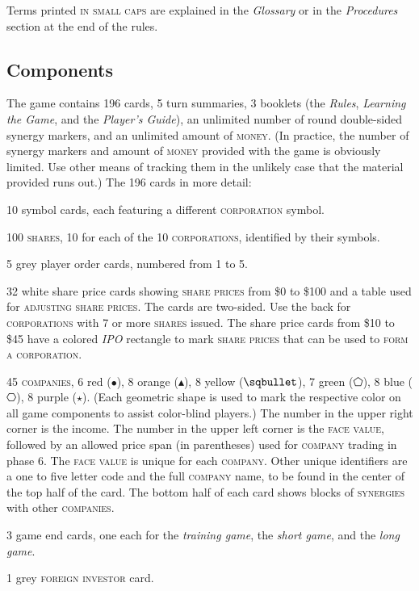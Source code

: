\documentclass[8pt]{extarticle}
\newenvironment{my_itemize}
{\begin{list}{\labelitemi}{\leftmargin=1.2em}
  \setlength{\itemsep}{1pt}
  \setlength{\parskip}{0pt}
  \setlength{\parsep}{0pt}}
{\end{list}}
\begin{document}
\begin{small}
\begin{multicols}{2}

{

  Terms printed \textsc{in small caps} are explained in the
  \emph{Glossary} or in the \emph{Procedures} section at the end of
  the rules.

\subsection*{Components}

The game contains 196 cards, 5 turn summaries, 3 booklets (the
\emph{Rules}, \emph{Learning the Game}, and the \emph{Player's
  Guide}), an unlimited number of round double-sided synergy markers,
and an unlimited amount of \textsc{money}. (In practice, the number of
synergy markers and amount of \textsc{money} provided with the game is
obviously limited. Use other means of tracking them in the unlikely
case that the material provided runs out.) The 196 cards in more
detail:
\begin{my_itemize}
\item 10 symbol cards, each featuring a different
  \textsc{corporation} symbol.
\item 100 \textsc{shares}, 10 for each of the 10
  \textsc{corporations}, identified by their symbols.
\item 5 grey player order cards, numbered from 1 to 5.
\item 32 white share price cards showing \textsc{share prices} from
  \$0 to \$100 and a table used for \textsc{adjusting share
    prices}. The cards are two-sided. Use the back for
  \textsc{corporations} with 7 or more \textsc{shares} issued. The
  share price cards from \$10 to \$45 have a colored \emph{IPO}
  rectangle to mark \textsc{share prices} that can be used to
  \textsc{form a corporation}.
\item 45 \textsc{companies}, 6 red ($\bullet$), 8 orange
  ($\blacktriangleup$), 8 yellow ($\sqbullet$), 7 green ($\pentagon$),
  8 blue ($\hexagon$), 8 purple ($\star$). (Each geometric shape is
  used to mark the respective color on all game components to assist
  color-blind players.) The number in the upper right corner is the
  income. The number in the upper left corner is the \textsc{face
    value}, followed by an allowed price span (in parentheses) used
  for \textsc{company} trading in phase 6. The \textsc{face value} is
  unique for each \textsc{company}. Other unique identifiers are a one
  to five letter code and the full \textsc{company} name, to be found
  in the center of the top half of the card. The bottom half of each
  card shows blocks of \textsc{synergies} with other
  \textsc{companies}.
\item 3 game end cards, one each for the \emph{training game}, the
  \emph{short game}, and the \emph{long game}.
\item 1 grey \textsc{foreign investor} card.
\end{my_itemize}

}
\end{multicols}
\end{small}
\end{document}
